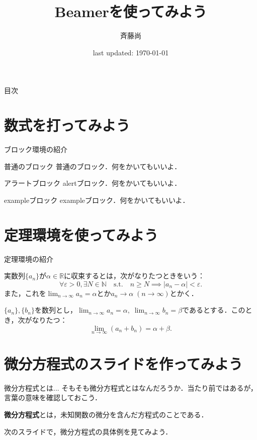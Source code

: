 \documentclass[dvipdfmx,aspectratio=141]{beamer}
\title{Beamerを使ってみよう}
\author[斉藤尚]{斉藤尚} %
\institute[FU]{福島大学 共生システム理工学類} %
\date{last updated: \today}
\begin{document}
\maketitle

\begin{frame}{目次}
    \tableofcontents
\end{frame}

\section{数式を打ってみよう}
\begin{frame}{ブロック環境の紹介}
  \begin{block}{普通のブロック}
    普通のブロック．何をかいてもいいよ．
  \end{block}
  \begin{alertblock}{アラートブロック}
    alertブロック．何をかいてもいいよ．
  \end{alertblock}
  \begin{exampleblock}{exampleブロック}
    exampleブロック．何をかいてもいいよ．
  \end{exampleblock}
\end{frame}

\section{定理環境を使ってみよう}
\begin{frame}{定理環境の紹介}
  \begin{definition}[数列の収束]
    実数列$\{a_n\}$が$\alpha \in \mathbb{R}$に収束するとは，次がなりたつときをいう：
    \[ \forall \varepsilon>0, \exists N \in \mathbb{N} \quad \text{s.t.} \quad n \geq N \implies |a_n - \alpha|<\varepsilon.\]
    また，これを$\lim_{n \to \infty}a_n = \alpha$とか$a_n \to \alpha \; (n \to \infty)$とかく．
  \end{definition}
  \begin{theorem}
    $\{a_n\}, \{b_n\}$を数列とし，$\lim_{n \to \infty} a_n = \alpha, \; \lim_{n \to \infty} b_n = \beta$であるとする．このとき，次がなりたつ：
    \[ \lim_{n \to \infty} (a_n + b_n) = \alpha + \beta.\]
  \end{theorem}
\end{frame}

\section{微分方程式のスライドを作ってみよう}
\begin{frame}{微分方程式とは...}
    そもそも微分方程式とはなんだろうか．当たり前ではあるが，言葉の意味を確認しておこう．
    \begin{definition}
        \textbf{微分方程式}とは，未知関数の微分を含んだ方程式のことである．
    \end{definition}
    次のスライドで，微分方程式の具体例を見てみよう．
\end{frame}
\end{document}
